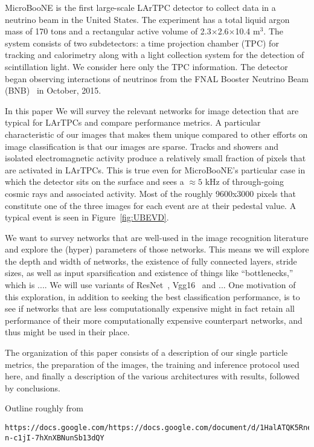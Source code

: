 \documentclass[11pt,a4paper]{article}
\begin{document}
MicroBooNE is the first large-scale LArTPC detector to collect data in a neutrino beam in the United States. The experiment has a total liquid argon mass of 170 tons and a rectangular active volume of 2.3$\times$2.6$\times$10.4 m$^3$. The system consists of two subdetectors: a time projection chamber (TPC) for tracking and calorimetry along with a light collection system for the detection of scintillation light. We consider here only the TPC information. The detector began observing interactions of neutrinos from the FNAL Booster Neutrino Beam (BNB)~\cite{BNB} in October, 2015.


In this paper We will survey the relevant networks for image detection that are typical for LArTPCs and compare performance metrics. A particular characteristic of our images that makes them unique compared to other efforts on image classification is that our images are sparse. Tracks and showers and isolated electromagnetic activity produce a relatively small fraction of pixels that are activated in LArTPCs. This is true even for MicroBooNE's particular case in which the detector sits on the surface and sees a $\approx 5 $ kHz of through-going cosmic rays and associated activity. Most of the roughly 9600x3000 pixels that constitute one of the three images for each event are at their pedestal value. A typical event is seen in Figure~\ref{fig:UBEVD}.

We want to survey networks that are well-used in the image recognition literature and explore the (hyper) parameters of those networks. This means we will explore the depth and width of networks, the existence of fully connected layers, stride sizes, as well as input sparsification and existence of things like ``bottlenecks,'' which is .... We will use variants of ResNet~\cite{}, Vgg16~\cite{} and ... One motivation of this exploration, in addition to seeking the best classification performance, is to see if networks that are less computationally expensive might in fact retain all performance of their more computationally expensive counterpart networks, and thus might be used in their place.

The organization of this paper consists of a description of our single particle metrics, the preparation of the images, the training and inference protocol used here, and finally a description of the various architectures with results, followed by conclusions.

{\color{red} Outline roughly from 
\begin{verbatim}https://docs.google.com/https://docs.google.com/document/d/1HalATQK5RneLrzhL2Tk-n-c1jI-7hXnXBNunSb13dQY
\end{verbatim}
}
\end{document}
